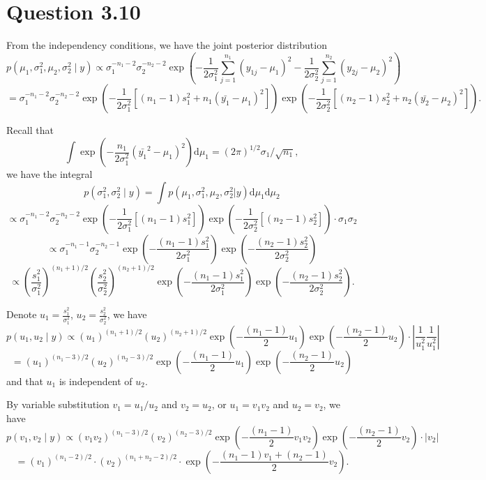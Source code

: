 \documentclass{article}
\begin{document}
\section*{Question 3.10}
{
    From the independency conditions, we have the joint posterior distribution
    $$p(\mu_1, \sigma_1^2, \mu_2, \sigma_2^2 \mid y) \propto \sigma_1^{-n_1-2} \sigma_2^{-n_2-2} \exp{\left( - \frac{1}{2\sigma_1^2} \sum_{j=1}^{n_1}{(y_{1j}-\mu_1)^2} - \frac{1}{2\sigma_2^2} \sum_{j=1}^{n_2}{(y_{2j}-\mu_2)^2} \right)}$$
    $$= \sigma_1^{-n_1-2} \sigma_2^{-n_2-2} \exp{\left( - \frac{1}{2\sigma_1^2} {\left[ (n_1-1)s_1^2 + n_1 (\bar{y_1} - \mu_1)^2 \right]} \right)} \exp{\left( - \frac{1}{2\sigma_2^2} {\left[ (n_2-1)s_2^2 + n_2 (\bar{y_2} - \mu_2)^2 \right]} \right)}.$$

    Recall that $$\int {\exp{\left(-\frac{n_1}{2\sigma_1^2} (\bar{y_1}^2 - \mu_1)^2 \right)} \mathrm{d}\mu_1} = (2\pi)^{1/2} \sigma_1 / \sqrt{n_1},$$ we have the integral
    $$p(\sigma_1^2, \sigma_2^2 \mid y) = \int {p(\mu_1, \sigma_1^2, \mu_2, \sigma_2^2 | y) \mathrm{d}\mu_1 \mathrm{d}\mu_2} $$
    $$\propto \sigma_1^{-n_1-2} \sigma_2^{-n_2-2} \exp{\left( - \frac{1}{2\sigma_1^2} {\left[ (n_1-1)s_1^2 \right]} \right)}  \exp{\left( - \frac{1}{2\sigma_2^2} {\left[ (n_2-1)s_2^2 \right]} \right)} \cdot \sigma_1 \sigma_2$$
    $$\propto \sigma_1^{-n_1-1} \sigma_2^{-n_2-1} \exp{\left( - \frac{(n_1-1)s_1^2}{2\sigma_1^2} \right)} \exp{\left( - \frac{(n_2-1)s_2^2}{2\sigma_2^2} \right)}$$
    $$\propto \left(\frac{s_1^2}{\sigma_1^2}\right)^{(n_1+1)/2} \left(\frac{s_2^2}{\sigma_2^2}\right)^{(n_2+1)/2} \exp{\left( - \frac{(n_1-1)s_1^2}{2\sigma_1^2} \right)} \exp{\left( - \frac{(n_2-1)s_2^2}{2\sigma_2^2} \right)}.$$

    Denote $u_1 = \frac{s_1^2}{\sigma_1^2}$, $u_2 = \frac{s_2^2}{\sigma_2^2}$, we have
    $$p(u_1, u_2 \mid y) \propto \left(u_1\right)^{(n_1+1)/2} \left(u_2\right)^{(n_2+1)/2} \exp{\left( - \frac{(n_1-1)}{2} u_1 \right)} \exp{\left( - \frac{(n_2-1)}{2} u_2 \right)} \cdot \left| \frac{1}{u_1^2} \frac{1}{u_1^2} \right|$$
    $$= \left(u_1\right)^{(n_1-3)/2} \left(u_2\right)^{(n_2-3)/2} \exp{\left( - \frac{(n_1-1)}{2} u_1 \right)} \exp{\left( - \frac{(n_2-1)}{2} u_2 \right)}$$
    and that $u_1$ is independent of $u_2$.
    
    By variable substitution $v_1 = u_1/u_2$ and $v_2 = u_2$, or $u_1 = v_1 v_2$ and $u_2 = v_2$, we have
    $$p(v_1, v_2 \mid y) \propto \left(v_1 v_2\right)^{(n_1-3)/2} \left(v_2\right)^{(n_2-3)/2} \exp{\left( - \frac{(n_1-1)}{2} v_1 v_2 \right)} \exp{\left( - \frac{(n_2-1)}{2} v_2 \right)} \cdot \left| v_2 \right|$$
    $$ = (v_1)^{(n_1-2)/2} \cdot (v_2)^{(n_1+n_2-2)/2} \cdot \exp{\left( -\frac{(n_1-1)v_1 + (n_2-1)}{2} v_2 \right)}.$$

}
\end{document}
